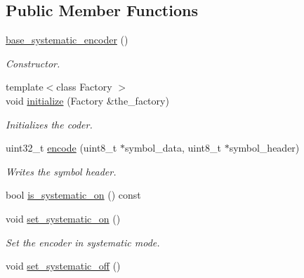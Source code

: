 \subsection*{Public Member Functions}
\begin{DoxyCompactItemize}
\item 
\hypertarget{classkodo_1_1base__systematic__encoder_a7cf1dac10a8d4533610bd8207854f6c0}{\hyperlink{classkodo_1_1base__systematic__encoder_a7cf1dac10a8d4533610bd8207854f6c0}{base\-\_\-systematic\-\_\-encoder} ()}\label{classkodo_1_1base__systematic__encoder_a7cf1dac10a8d4533610bd8207854f6c0}

\begin{DoxyCompactList}\small\item\em Constructor. \end{DoxyCompactList}\item 
{\footnotesize template$<$class Factory $>$ }\\void \hyperlink{classkodo_1_1base__systematic__encoder_a5d575f19931ae6136b68dabb1a7b193b}{initialize} (Factory \&the\-\_\-factory)
\begin{DoxyCompactList}\small\item\em Initializes the coder. \end{DoxyCompactList}\item 
uint32\-\_\-t \hyperlink{classkodo_1_1base__systematic__encoder_aa7dc3b7d97f4aad4b083ef4260358a5d}{encode} (uint8\-\_\-t $\ast$symbol\-\_\-data, uint8\-\_\-t $\ast$symbol\-\_\-header)
\begin{DoxyCompactList}\small\item\em Writes the symbol header. \end{DoxyCompactList}\item 
bool \hyperlink{classkodo_1_1base__systematic__encoder_a394f7f89b642844db3e0db91819e39fa}{is\-\_\-systematic\-\_\-on} () const 
\item 
\hypertarget{classkodo_1_1base__systematic__encoder_a4b09755cebbd9c02c52d1cad84ab0b6f}{void \hyperlink{classkodo_1_1base__systematic__encoder_a4b09755cebbd9c02c52d1cad84ab0b6f}{set\-\_\-systematic\-\_\-on} ()}\label{classkodo_1_1base__systematic__encoder_a4b09755cebbd9c02c52d1cad84ab0b6f}

\begin{DoxyCompactList}\small\item\em Set the encoder in systematic mode. \end{DoxyCompactList}\item 
\hypertarget{classkodo_1_1base__systematic__encoder_a57afe9a2c762088142c10710b90a23a6}{void \hyperlink{classkodo_1_1base__systematic__encoder_a57afe9a2c762088142c10710b90a23a6}{set\-\_\-systematic\-\_\-off} ()}\label{classkodo_1_1base__systematic__encoder_a57afe9a2c762088142c10710b90a23a6}


\end{DoxyCompactItemize}

